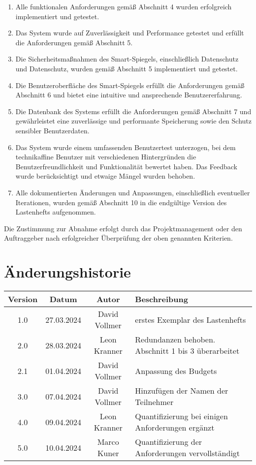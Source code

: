 \documentclass{article}
\begin{document}
\begin{enumerate}
    \item Alle funktionalen Anforderungen gemäß Abschnitt 4 wurden erfolgreich implementiert und getestet.
    \item Das System wurde auf Zuverlässigkeit und Performance getestet und erfüllt die Anforderungen gemäß Abschnitt 5.
    \item Die Sicherheitsmaßnahmen des Smart-Spiegels, einschließlich Datenschutz und Datenschutz, wurden gemäß Abschnitt 5 implementiert und getestet.
    \item Die Benutzeroberfläche des Smart-Spiegels erfüllt die Anforderungen gemäß Abschnitt 6 und bietet eine intuitive und ansprechende Benutzererfahrung.
    \item Die Datenbank des Systems erfüllt die Anforderungen gemäß Abschnitt 7 und gewährleistet eine zuverlässige und performante Speicherung sowie den Schutz sensibler Benutzerdaten.
    \item Das System wurde einem umfassenden Benutzertest unterzogen, bei dem technikaffine Benutzer mit verschiedenen Hintergründen die Benutzerfreundlichkeit und Funktionalität bewertet haben. Das Feedback wurde berücksichtigt und etwaige Mängel wurden behoben.
    \item Alle dokumentierten Änderungen und Anpassungen, einschließlich eventueller Iterationen, wurden gemäß Abschnitt 10 in die endgültige Version des Lastenhefts aufgenommen.
\end{enumerate}

Die Zustimmung zur Abnahme erfolgt durch das Projektmanagement oder den Auftraggeber nach erfolgreicher Überprüfung der oben genannten Kriterien.


\section{Änderungshistorie}
\begin{tabular}{|c|c|c|l|}
    \hline
    Version & Datum & Autor & Beschreibung \\
    \hline
    1.0 & 27.03.2024 & David Vollmer & erstes Exemplar des Lastenhefts \\
    \hline
    2.0 & 28.03.2024 & Leon Kranner & Redundanzen behoben. Abschnitt 1 bis 3 überarbeitet \\
    \hline
    2.1 & 01.04.2024 & David Vollmer & Anpassung des Budgets \\
    \hline
    3.0 & 07.04.2024 & David Vollmer & Hinzufügen der Namen der Teilnehmer \\
    \hline
    4.0 & 09.04.2024 & Leon Kranner & Quantifizierung bei einigen Anforderungen ergänzt \\
    \hline
    5.0 & 10.04.2024 & Marco Kuner & Quantifizierung der Anforderungen vervollständigt \\
    \hline
\end{tabular}
\end{document}
